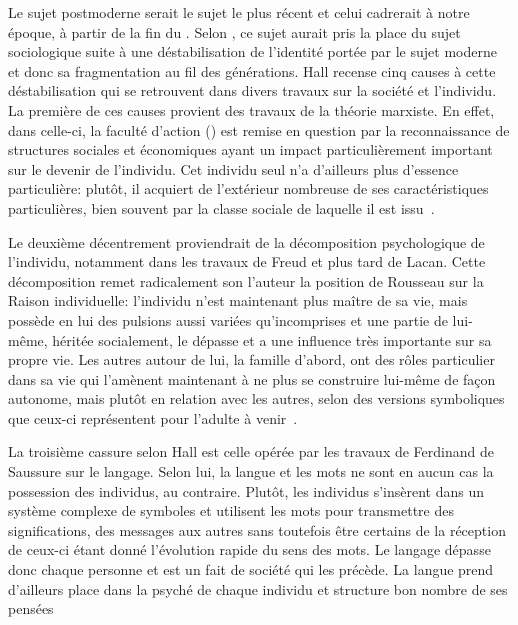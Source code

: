 Le sujet postmoderne serait le sujet le plus récent et celui cadrerait à notre époque, à partir de la fin du . 
Selon \citeauthor{Hall1996a}, ce sujet aurait pris la place du sujet sociologique suite à une déstabilisation de l'identité portée par le sujet moderne et donc sa fragmentation au fil des générations. 
Hall recense cinq causes à cette déstabilisation qui se retrouvent dans divers travaux sur la société et l'individu. 
La première de ces causes provient des travaux de la théorie marxiste. 
En effet, dans celle-ci, la faculté d'action () est remise en question par la reconnaissance de structures sociales et économiques ayant un impact particulièrement important sur le devenir de l'individu. 
Cet individu seul n'a d'ailleurs plus d'essence particulière: plutôt, il acquiert de l'extérieur nombreuse de ses caractéristiques particulières, bien souvent par la classe sociale de laquelle il est issu~\citeyearpar[606]{Hall1996a}.

Le deuxième décentrement proviendrait de la décomposition psychologique de l'individu, notamment dans les travaux de Freud et plus tard de Lacan. 
Cette décomposition remet radicalement son l'auteur la position de Rousseau sur la Raison individuelle: l'individu n'est maintenant plus maître de sa vie, mais possède en lui des pulsions aussi variées qu'incomprises et une partie de lui-même, héritée socialement, le dépasse et a une influence très importante sur sa propre vie. 
Les autres autour de lui, la famille d'abord, ont des rôles particulier dans sa vie qui l'amènent maintenant à ne plus se construire lui-même de façon autonome, mais plutôt en relation avec les autres, selon des versions symboliques que ceux-ci représentent pour l'adulte à venir~\citeyearpar[ 607--608]{Hall1996a}.

La troisième cassure selon Hall est celle opérée par les travaux de Ferdinand de Saussure sur le langage. 
Selon lui, la langue et les mots ne sont en aucun cas la possession des individus, au contraire. 
Plutôt, les individus s'insèrent dans un système complexe de symboles et utilisent les mots pour transmettre des significations, des messages aux autres sans toutefois être certains de la réception de ceux-ci étant donné l'évolution rapide du sens des mots. 
Le langage dépasse donc chaque personne et est un fait de société qui les précède. 
La langue prend d'ailleurs place dans la psyché de chaque individu et structure bon nombre de ses pensées~\citeyearpar[608--609]{Hall1996a}

